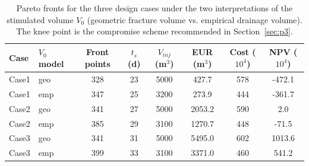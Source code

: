 \begin{table}[htbp]
\centering
\caption{Pareto fronts for the three design cases under the two interpretations of the stimulated volume $V_0$ (geometric fracture volume vs. empirical drainage volume). The knee point is the compromise scheme recommended in Section~\ref{sec:p3}.}
\label{tab:pareto}
\small
\begin{tabular}{@{}llcccccc@{}}
\toprule
Case & $V_0$ model & Front points & $t_s$ (d) & $V_{inj}$ (m$^3$) & EUR (m$^3$) & Cost ($10^4$) & NPV ($10^4$) \\
\midrule
Case1 & geo & 328 & 23 & 5000 & 427.7 & 578 & -472.1 \\
Case1 & emp & 347 & 25 & 3200 & 273.9 & 444 & -361.7 \\
Case2 & geo & 341 & 27 & 5000 & 2053.2 & 590 & 2.0 \\
Case2 & emp & 385 & 29 & 3100 & 1270.7 & 448 & -71.5 \\
Case3 & geo & 341 & 31 & 5000 & 5495.0 & 602 & 1013.6 \\
Case3 & emp & 399 & 33 & 3100 & 3371.0 & 460 & 541.2 \\
\bottomrule
\end{tabular}
\end{table}
